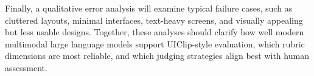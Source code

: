 \documentclass[pdflatex,sn-mathphys-num]{sn-jnl}
\begin{document}
Finally, a qualitative error analysis will examine typical failure cases, such as
cluttered layouts, minimal interfaces, text-heavy screens, and visually appealing but
less usable designs. Together, these analyses should clarify how well modern
multimodal large language models support UIClip-style evaluation, which rubric
dimensions are most reliable, and which judging strategies align best with human
assessment.

\backmatter

{\footnotesize\setlength{\bibsep}{0pt}}
\end{document}
